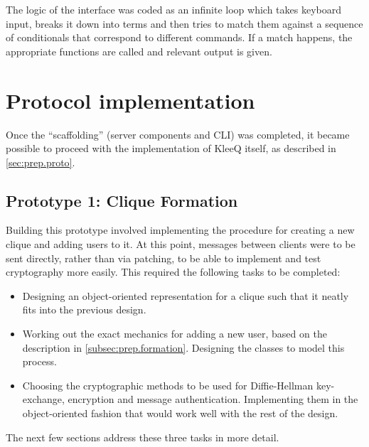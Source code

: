 \documentclass[a4paper, 12pt]{report}
\begin{document}
The logic of the interface was coded as an infinite loop which takes keyboard input, breaks it down into terms and then tries to match them against a sequence of conditionals that correspond to different commands. If a match happens, the appropriate functions are called and relevant output is given.


\section{Protocol implementation}
Once the ``scaffolding'' (server components and CLI) was completed, it became possible to proceed with the implementation of KleeQ itself, as described in \cref{sec:prep.proto}.


\subsection{Prototype 1: Clique Formation}
\label{subsec:impl.proto.formation}
Building this prototype involved implementing the procedure for creating a new clique and adding users to it. At this point, messages between clients were to be sent directly, rather than via patching, to be able to implement and test cryptography more easily. This required the following tasks to be completed:

\begin{itemize}
    \item Designing an object-oriented representation for a clique such that it neatly fits into the previous design.
    \item Working out the exact mechanics for adding a new user, based on the description in \cref{subsec:prep.formation}. Designing the classes to model this process.
    \item Choosing the cryptographic methods to be used for Diffie-Hellman key-exchange, encryption and message authentication. Implementing them in the object-oriented fashion that would work well with the rest of the design.
\end{itemize}

The next few sections address these three tasks in more detail.
\end{document}
